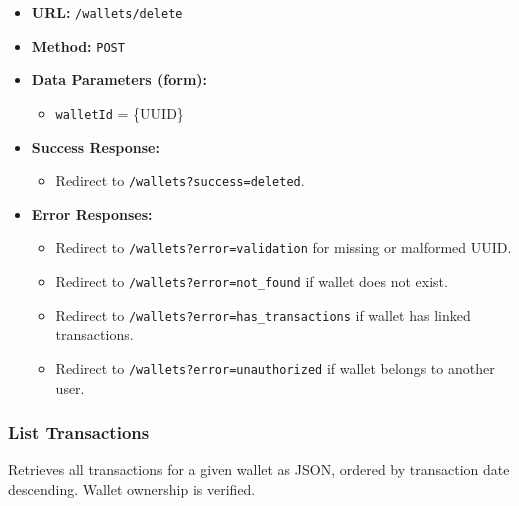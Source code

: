 \begin{itemize}
    \item \textbf{URL:} \texttt{/wallets/delete}
    \item \textbf{Method:} \texttt{POST}
    \item \textbf{Data Parameters (form):}
    \begin{itemize}
        \item \texttt{walletId} = \{UUID\}
    \end{itemize}
    \item \textbf{Success Response:}
    \begin{itemize}
        \item Redirect to \texttt{/wallets?success=deleted}.
    \end{itemize}
    \item \textbf{Error Responses:}
    \begin{itemize}
        \item Redirect to \texttt{/wallets?error=validation} for missing or malformed UUID.
        \item Redirect to \texttt{/wallets?error=not\_found} if wallet does not exist.
        \item Redirect to \texttt{/wallets?error=has\_transactions} if wallet has linked transactions.
        \item Redirect to \texttt{/wallets?error=unauthorized} if wallet belongs to another user.
    \end{itemize}
\end{itemize}


\subsubsection{List Transactions}

Retrieves all transactions for a given wallet as JSON, ordered by transaction date descending. Wallet ownership is verified.

